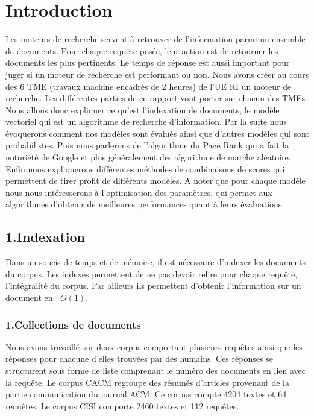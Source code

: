 \documentclass[a4paper,11pt]{report}
\newcommand{\bigO}[1]{\ensuremath{\mathop{}\mathopen{}O\mathopen{}\left(#1\right)}}
\begin{document}
\chapter*{{\centering Introduction}}
Les moteurs de recherche servent à retrouver de l'information parmi un ensemble de documents. Pour chaque requête posée, leur action est de retourner les documents les plus pertinents. Le temps de réponse est aussi important pour juger si un moteur de recherche est performant ou non. Nous avons créer au cours des 6 TME (travaux machine encadrés de 2 heures) de l'UE RI un moteur de recherche. Les différentes parties de ce rapport vont porter sur chacun des TMEs. Nous allons donc expliquer ce qu'est l'indexation de documents, le modèle vectoriel qui est un algorithme de recherche d'information. Par la suite nous évoquerons comment nos modèles sont évalués ainsi que d'autres modèles qui sont probabilistes. Puis nous parlerons de l'algorithme du Page Rank qui a fait la notoriété de Google et plus généralement des algorithme de marche aléatoire.  Enfin nous expliquerons différentes méthodes de combinaisons de scores qui permettent de tirer profit de différents modèles.
A noter que pour chaque modèle nous nous intéresserons à l'optimisation des paramètres, qui permet aux algorithmes d'obtenir de meilleures performances quant à leurs évaluations.



\section*{1.Indexation}
Dans un soucis de temps et de mémoire, il est nécessaire d'indexer les documents du corpus. Les indexes permettent de ne pas devoir relire pour chaque requête, l'intégralité du corpus. Par ailleurs ils permettent d'obtenir l'information sur un document en \bigO{1}.
\subsection*{1.Collections de documents}
Nous avons travaillé sur deux corpus comportant plusieurs requêtes ainsi que les réponses pour chacune d'elles trouvées par des humains. Ces réponses se structurent sous forme de liste comprenant le numéro des documents en lien avec la requête. Le corpus CACM regroupe des résumés d'articles provenant de la partie communication du journal ACM. Ce corpus compte 4204 textes et 64 requêtes. Le corpus CISI comporte 2460 textes et 112 requêtes.
\end{document}
